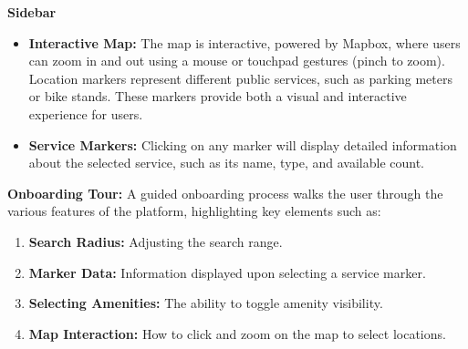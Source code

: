 \textbf{Sidebar}\\
\begin{itemize}
    \item \textbf{Interactive Map:} The map is interactive, powered by Mapbox, where users can zoom in and out using a mouse or touchpad gestures (pinch to zoom). Location markers represent different public services, such as parking meters or bike stands. These markers provide both a visual and interactive experience for users.
    \item \textbf{Service Markers:} Clicking on any marker will display detailed information about the selected service, such as its name, type, and available count.
\end{itemize}
\textbf{Onboarding Tour:}
A guided onboarding process walks the user through the various features of the platform, highlighting key elements such as:
\begin{enumerate}
    \item \textbf{Search Radius:} Adjusting the search range.
    \item \textbf{Marker Data:} Information displayed upon selecting a service marker.
    \item \textbf{Selecting Amenities:} The ability to toggle amenity visibility.
    \item \textbf{Map Interaction:} How  to click and zoom on the map to select locations.
\end{enumerate}